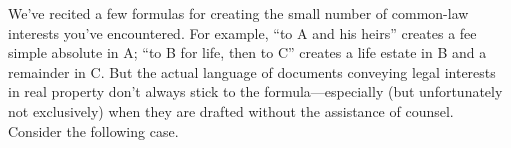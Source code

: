 We've recited a few formulas for creating the small number of common-law
interests you've encountered. For example, ``to A and his heirs'' creates a fee
simple absolute in A; ``to B for life, then to C'' creates a life estate in B
and a remainder in C. But the actual language of documents conveying legal
interests in real property don't always stick to the formula---especially (but
unfortunately not exclusively) when they are drafted without the assistance of
counsel. Consider the following case.

